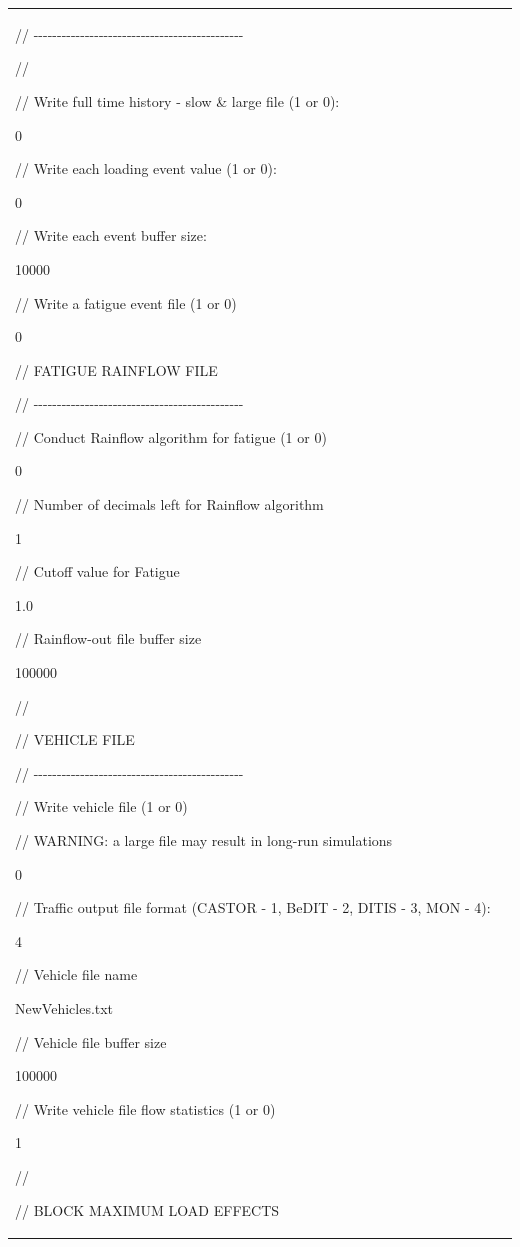 \documentclass[
]{article}
\begin{document}
\begin{longtable}[]{@{}
  >{\centering\arraybackslash}p{}
  >{\raggedright\arraybackslash}p{}@{}}
//
-\/-\/-\/-\/-\/-\/-\/-\/-\/-\/-\/-\/-\/-\/-\/-\/-\/-\/-\/-\/-\/-\/-\/-\/-\/-\/-\/-\/-\/-\/-\/-\/-\/-\/-\/-\/-\/-\/-\/-\/-\/-\/-\/-\/-

//

// Write full time history - slow \& large file (1 or 0):

0

// Write each loading event value (1 or 0):

0

// Write each event buffer size:

10000

// Write a fatigue event file (1 or 0)

0

// FATIGUE RAINFLOW FILE

//
-\/-\/-\/-\/-\/-\/-\/-\/-\/-\/-\/-\/-\/-\/-\/-\/-\/-\/-\/-\/-\/-\/-\/-\/-\/-\/-\/-\/-\/-\/-\/-\/-\/-\/-\/-\/-\/-\/-\/-\/-\/-\/-\/-\/-

// Conduct Rainflow algorithm for fatigue (1 or 0)

0

// Number of decimals left for Rainflow algorithm

1

// Cutoff value for Fatigue

1.0

// Rainflow-out file buffer size

100000

//

// VEHICLE FILE

//
-\/-\/-\/-\/-\/-\/-\/-\/-\/-\/-\/-\/-\/-\/-\/-\/-\/-\/-\/-\/-\/-\/-\/-\/-\/-\/-\/-\/-\/-\/-\/-\/-\/-\/-\/-\/-\/-\/-\/-\/-\/-\/-\/-\/-

// Write vehicle file (1 or 0)

// WARNING: a large file may result in long-run simulations

0

// Traffic output file format (CASTOR - 1, BeDIT - 2, DITIS - 3, MON -
4):

4

// Vehicle file name

NewVehicles.txt

// Vehicle file buffer size

100000

// Write vehicle file flow statistics (1 or 0)

1

//

// BLOCK MAXIMUM LOAD EFFECTS


\end{longtable}
\end{document}
